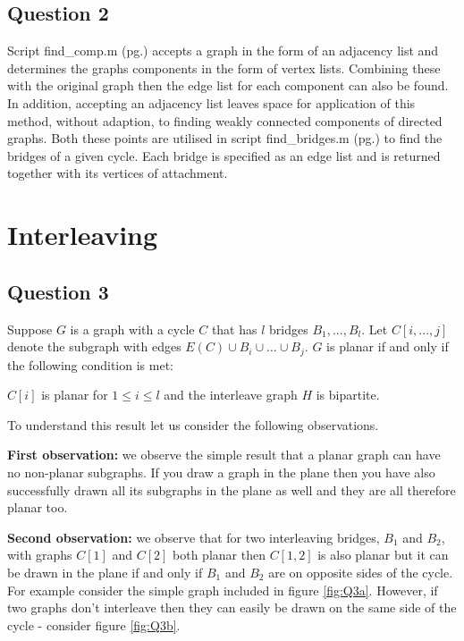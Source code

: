 \documentclass[a4paper]{article}
\begin{document}
\subsection*{Question 2}
Script find\_comp.m (pg.\pageref{Pfind_comp}) accepts a graph in the form of an adjacency list and determines the graphs components in the form of vertex lists. Combining these with the original graph then the edge list for each component can also be found. In addition, accepting an adjacency list leaves space for application of this method, without adaption, to finding weakly connected components of directed graphs. Both these points are utilised in script find\_bridges.m (pg.\pageref{Pfind_bridges}) to find the bridges of a given cycle. Each bridge is specified as an edge list and is returned together with its vertices of attachment.

\section*{Interleaving}

\subsection*{Question 3}

Suppose $G$ is a graph with a cycle $C$ that has $l$ bridges $B_1, ..., B_l$. Let $C[i,...,j]$ denote the subgraph with edges $E(C) \cup B_i \cup \hdots \cup B_j$. $G$ is planar if and only if the following condition is met:
\begin{center}
    $C[i]$ is planar for $1 \leq i \leq l$ and the interleave graph $H$ is bipartite.
\end{center}

To understand this result let us consider the following observations.

\vspace{\baselineskip}
\textbf{First observation:} we observe the simple result that a planar graph can have no non-planar subgraphs. If you draw a graph in the plane then you have also successfully drawn all its subgraphs in the plane as well and they are all therefore planar too.

\vspace{\baselineskip}
\textbf{Second observation:} we observe that for two interleaving bridges, $B_1$ and $B_2$, with graphs $C[1]$ and $C[2]$ both planar then $C[1,2]$ is also planar but it can be drawn in the plane if and only if $B_1$ and $B_2$ are on opposite sides of the cycle. For example consider the simple graph included in figure \ref{fig:Q3a}. However, if two graphs don't interleave then they can easily be drawn on the same side of the cycle - consider figure \ref{fig:Q3b}.
\end{document}
